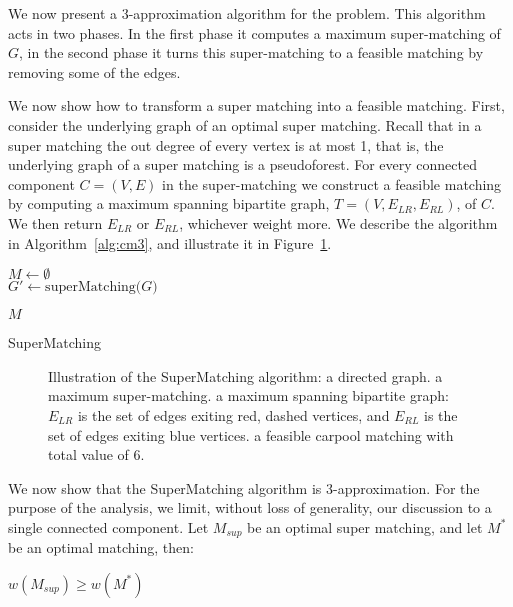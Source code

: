 \label{sec:cm}
We now present a 3-app\-roximation algorithm for the \textsc{\CARPOOL{}} problem.
This algorithm acts in two phases.
In the first phase it computes a maximum super-matching of $G$, 
in the second phase it turns this super-matching to a feasible matching
by removing some of the edges.

We now show how to transform a super matching into a feasible matching.
First, consider the underlying graph of an optimal super matching.
Recall that in a super matching the out degree of every vertex is at most 1,
that is, the underlying graph of a super matching is a pseudoforest.
For every connected component $C = (V, E)$ 
in the super-matching we construct a feasible matching by
computing a maximum spanning bipartite graph, $T = (V, E_{LR}, E_{RL})$, 
of $C$. 
We then return $E_{LR}$ or $E_{RL}$, whichever weight more. 
We describe the algorithm in Algorithm~\ref{alg:cm3}, 
and illustrate it in Figure~\ref{fig:spanning-bipartite-graph}.   

\begin{algorithm}[t]

$M \leftarrow \emptyset$								\\
$G' \leftarrow \text{superMatching($G$)}$				\\


\Return $M$
\caption{
\label{alg:cm3}
SuperMatching}
\end{algorithm}

\begin{figure}
\centering

\caption[]{
\label{fig:spanning-bipartite-graph}
Illustration of the SuperMatching algorithm:
 a directed graph. 
 a maximum super-matching.  
 a maximum spanning bipartite graph:
$E_{LR}$ is the set of edges exiting red, dashed vertices, 
and $E_{RL}$ is the set of edges exiting blue vertices.
 a feasible carpool matching with total value of 6.   
}
\end{figure}

We now show that the SuperMatching algorithm is 3-approximation.
For the purpose of the analysis, we limit, without loss of generality, 
our discussion to a single connected component.
Let $M_{sup}$ be an optimal super matching, 
and let $M^*$ be an optimal matching, then:
\begin{lemma}
\label{lm:super-geq-m^*}
$w(M_{sup}) \geq w(M^*)$
\end{lemma}

